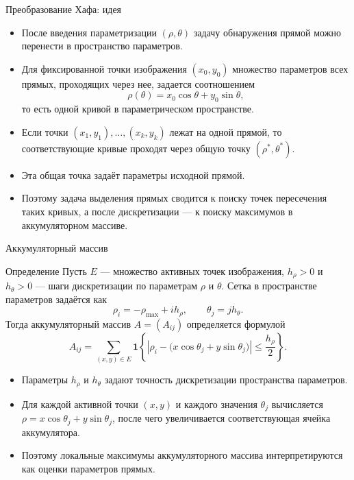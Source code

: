 \documentclass[unicode,notheorems]{beamer}
\begin{document}
\begin{frame}{Преобразование Хафа: идея}
	\begin{itemize}
		\item После введения параметризации $(\rho,\theta)$ задачу обнаружения прямой можно перенести в пространство параметров.
		\item Для фиксированной точки изображения $(x_0,y_0)$ множество параметров всех прямых, проходящих через нее, задается соотношением
		\[
		\rho(\theta) = x_0 \cos \theta + y_0 \sin \theta,
		\]
		то есть одной кривой в параметрическом пространстве.
		\item Если точки $(x_1,y_1),\dots,(x_k,y_k)$ лежат на одной прямой, то соответствующие кривые проходят через общую точку $(\rho^\ast,\theta^\ast)$.
		\item Эта общая точка задаёт параметры исходной прямой.
		\item Поэтому задача выделения прямых сводится к поиску точек пересечения таких кривых, а после дискретизации --- к поиску максимумов в аккумуляторном массиве.
	\end{itemize}
\end{frame}

\begin{frame}{Аккумуляторный массив}
	\small
	\begin{block}{Определение}
		{\scriptsize
		Пусть $E$ --- множество активных точек изображения,
		$h_\rho>0$ и $h_\theta>0$ --- шаги дискретизации по параметрам $\rho$ и $\theta$.
		Сетка в пространстве параметров задаётся как
		\[
		\rho_i = -\rho_{\max} + i h_\rho,\qquad
		\theta_j = j h_\theta.
		\]
		Тогда аккумуляторный массив $A=(A_{ij})$ определяется формулой
		\[
		A_{ij} =
		\sum_{(x,y)\in E}
		\mathbf{1}\left\{
		\left| \rho_i - \bigl(x\cos\theta_j + y\sin\theta_j\bigr) \right|
		\le \frac{h_\rho}{2}
		\right\}.
		\]
		}
	\end{block}

	\begin{itemize}
		\item Параметры $h_\rho$ и $h_\theta$ задают точность дискретизации пространства параметров.
		\item Для каждой активной точки $(x,y)$ и каждого значения $\theta_j$ вычисляется $\rho = x\cos\theta_j + y\sin\theta_j$, после чего увеличивается соответствующая ячейка аккумулятора.
		\item Поэтому локальные максимумы аккумуляторного массива интерпретируются как оценки параметров прямых.
	\end{itemize}
\end{frame}
\end{document}
